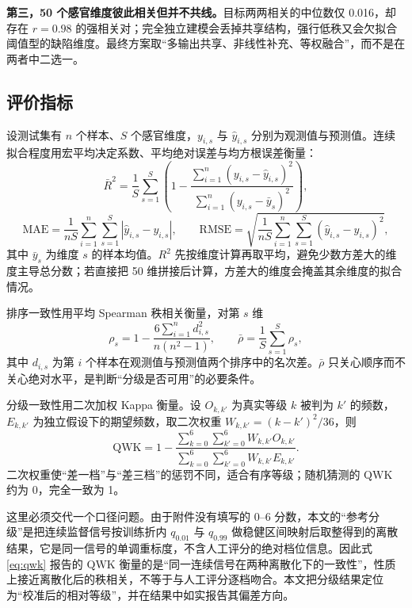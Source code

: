 ﻿\documentclass[UTF8,a4paper,zihao=-4]{ctexart}
\numberwithin{figure}{section}
\numberwithin{table}{section}
\numberwithin{equation}{section}
\begin{document}
\textbf{第三，50 个感官维度彼此相关但并不共线。}目标两两相关的中位数仅 0.016，却存在 $r=0.98$ 的强相关对；完全独立建模会丢掉共享结构，强行低秩又会欠拟合阈值型的缺陷维度。最终方案取“多输出共享、非线性补充、等权融合”，而不是在两者中二选一。

\subsection{评价指标}

设测试集有 $n$ 个样本、$S$ 个感官维度，$y_{i,s}$ 与 $\hat y_{i,s}$ 分别为观测值与预测值。连续拟合程度用宏平均决定系数、平均绝对误差与均方根误差衡量：
\begin{equation}
\bar R^2=\frac{1}{S}\sum_{s=1}^{S}\left(1-\frac{\sum_{i=1}^{n}(y_{i,s}-\hat y_{i,s})^2}{\sum_{i=1}^{n}(y_{i,s}-\bar y_s)^2}\right),
\label{eq:r2}
\end{equation}
\begin{equation}
\mathrm{MAE}=\frac{1}{nS}\sum_{i=1}^{n}\sum_{s=1}^{S}\left|\hat y_{i,s}-y_{i,s}\right|,\qquad
\mathrm{RMSE}=\sqrt{\frac{1}{nS}\sum_{i=1}^{n}\sum_{s=1}^{S}(\hat y_{i,s}-y_{i,s})^2},
\label{eq:maermse}
\end{equation}
其中 $\bar y_s$ 为维度 $s$ 的样本均值。$R^2$ 先按维度计算再取平均，避免少数方差大的维度主导总分数；若直接把 50 维拼接后计算，方差大的维度会掩盖其余维度的拟合情况。

排序一致性用平均 Spearman 秩相关衡量，对第 $s$ 维
\begin{equation}
\rho_s=1-\frac{6\sum_{i=1}^{n}d_{i,s}^{2}}{n(n^2-1)},\qquad \bar\rho=\frac{1}{S}\sum_{s=1}^{S}\rho_s,
\label{eq:spearman}
\end{equation}
其中 $d_{i,s}$ 为第 $i$ 个样本在观测值与预测值两个排序中的名次差。$\bar\rho$ 只关心顺序而不关心绝对水平，是判断“分级是否可用”的必要条件。

分级一致性用二次加权 Kappa 衡量\cite{cohen1968}。设 $O_{k,k'}$ 为真实等级 $k$ 被判为 $k'$ 的频数，$E_{k,k'}$ 为独立假设下的期望频数，取二次权重 $W_{k,k'}=(k-k')^2/36$，则
\begin{equation}
\mathrm{QWK}=1-\frac{\sum_{k=0}^{6}\sum_{k'=0}^{6}W_{k,k'}O_{k,k'}}{\sum_{k=0}^{6}\sum_{k'=0}^{6}W_{k,k'}E_{k,k'}}.
\label{eq:qwk}
\end{equation}
二次权重使“差一档”与“差三档”的惩罚不同，适合有序等级；随机猜测的 $\mathrm{QWK}$ 约为 0，完全一致为 1。

这里必须交代一个口径问题。由于附件没有填写的 0--6 分数，本文的“参考分级”是把连续监督信号按训练折内 $q_{0.01}$ 与 $q_{0.99}$ 做稳健区间映射后取整得到的离散结果，它是同一信号的单调重标度，不含人工评分的绝对档位信息。因此式\eqref{eq:qwk} 报告的 $\mathrm{QWK}$ 衡量的是“同一连续信号在两种离散化下的一致性”，性质上接近离散化后的秩相关，不等于与人工评分逐档吻合。本文把分级结果定位为“校准后的相对等级”，并在结果中如实报告其偏差方向。
\end{document}
